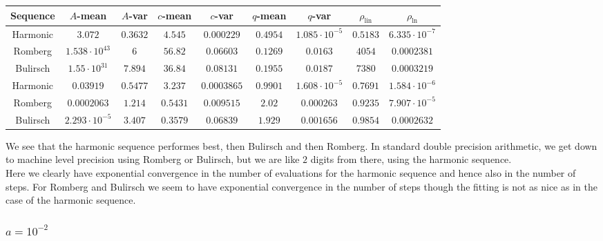 \begin{table}[H]
    \centering
    \small
    \begin{tabular}{c||c|c|c|c|c|c|c|c}
Sequence & \(A\)-mean & \(A\)-var & \(c\)-mean & \(c\)-var & \(q\)-mean & \(q\)-var & \(\rho_{\operatorname{lin}}\) & \(\rho_{\ln}\)\\\hline
\rowcolor{green}
Harmonic & \(3.072\) & \(0.3632\) & \(4.545\) & \(0.000229\) & \(0.4954\) & \(1.085\cdot 10^{-5}\) & \(0.5183\) & \(6.335\cdot 10^{-7}\) \\
\rowcolor{red}
Romberg & \(1.538\cdot 10^{43}\) & \(6\) & \(56.82\) & \(0.06603\) & \(0.1269\) & \(0.0163\) & \(4054\) & \(0.0002381\) \\
\rowcolor{red}
Bulirsch & \(1.55\cdot 10^{31}\) & \(7.894\) & \(36.84\) & \(0.08131\) & \(0.1955\) & \(0.0187\) & \(7380\) & \(0.0003219\) \\
\rowcolor{green}
Harmonic & \(0.03919\) & \(0.5477\) & \(3.237\) & \(0.0003865\) & \(0.9901\) & \(1.608\cdot 10^{-5}\) & \(0.7691\) & \(1.584\cdot 10^{-6}\) \\
\rowcolor{yellow}
Romberg & \(0.0002063\) & \(1.214\) & \(0.5431\) & \(0.009515\) & \(2.02\) & \(0.000263\) & \(0.9235\) & \(7.907\cdot 10^{-5}\) \\
\rowcolor{yellow}
Bulirsch & \(2.293\cdot 10^{-5}\) & \(3.407\) & \(0.3579\) & \(0.06839\) & \(1.929\) & \(0.001656\) & \(0.9854\) & \(0.0002632\) \\
    \end{tabular}
    \label{tab:my_label}
\end{table}

We see that the harmonic sequence performes best, then Bulirsch and then Romberg. In standard double precision arithmetic, we get down to machine level precision using Romberg or Bulirsch, but we are like \(2\) digits from there, using the harmonic sequence.\\

Here we clearly have exponential convergence in the number of evaluations for the harmonic sequence and hence also in the number of steps. For Romberg and Bulirsch we seem to have exponential convergence in the number of steps though the fitting is not as nice as in the case of the harmonic sequence.

\subsubsection{\(a= 10^{-2}\)}

